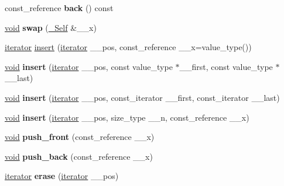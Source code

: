 \begin{DoxyCompactItemize}
\mbox{\label{classlist_a1846831a069a25a9a45d6b9e38f971d6}} 
const\+\_\+reference {\bfseries back} () const
\item 
\mbox{\label{classlist_a5d70b1952414c6bc2f1ae45748e28502}} 
\hyperlink{interfacevoid}{void} {\bfseries swap} (\hyperlink{classlist}{\+\_\+\+Self} \&\+\_\+\+\_\+x)
\item 
\hyperlink{structiterator}{iterator} \hyperlink{classlist_aeb24294695fdc7463abc2f6e6528db39}{insert} (\hyperlink{structiterator}{iterator} \+\_\+\+\_\+pos, const\+\_\+reference \+\_\+\+\_\+x=value\+\_\+type())
\item 
\mbox{\label{classlist_ad6e87ef5045b3b44941ef300cf636df0}} 
\hyperlink{interfacevoid}{void} {\bfseries insert} (\hyperlink{structiterator}{iterator} \+\_\+\+\_\+pos, const value\+\_\+type $\ast$\+\_\+\+\_\+first, const value\+\_\+type $\ast$\+\_\+\+\_\+last)
\item 
\mbox{\label{classlist_adf9c0573fd7755249cdef99c9ff75377}} 
\hyperlink{interfacevoid}{void} {\bfseries insert} (\hyperlink{structiterator}{iterator} \+\_\+\+\_\+pos, const\+\_\+iterator \+\_\+\+\_\+first, const\+\_\+iterator \+\_\+\+\_\+last)
\item 
\mbox{\label{classlist_a33c26c490c0b70a032dc2284200c975f}} 
\hyperlink{interfacevoid}{void} {\bfseries insert} (\hyperlink{structiterator}{iterator} \+\_\+\+\_\+pos, size\+\_\+type \+\_\+\+\_\+n, const\+\_\+reference \+\_\+\+\_\+x)
\item 
\mbox{\label{classlist_ade13dd8920217edbd196fa4c0d4af9df}} 
\hyperlink{interfacevoid}{void} {\bfseries push\+\_\+front} (const\+\_\+reference \+\_\+\+\_\+x)
\item 
\mbox{\label{classlist_a2964db83b0b72cafec08c052d44a1ee6}} 
\hyperlink{interfacevoid}{void} {\bfseries push\+\_\+back} (const\+\_\+reference \+\_\+\+\_\+x)
\item 
\mbox{\label{classlist_a4560bdf7557d5ded5e391aa961c2a94b}} 
\hyperlink{structiterator}{iterator} {\bfseries erase} (\hyperlink{structiterator}{iterator} \+\_\+\+\_\+pos)
\item 
\mbox{\label{classlist_a17614838a37bfb4bfd10bf136fe1adee}} 

\end{DoxyCompactItemize}
